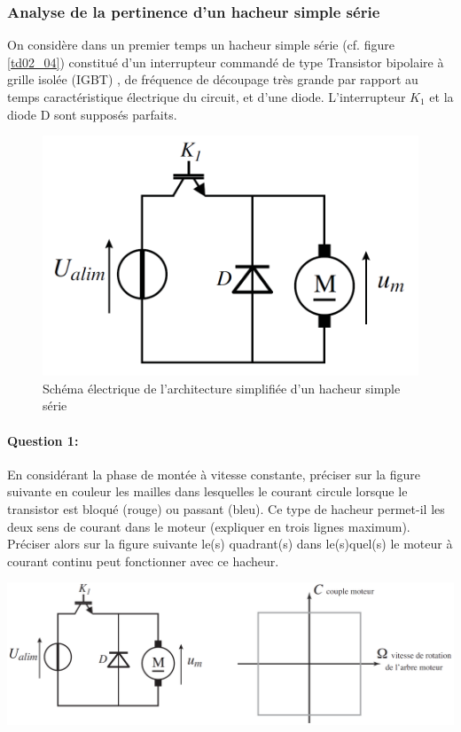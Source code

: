 \subsubsection{Analyse de la pertinence d'un hacheur simple série}

On considère dans un premier temps un hacheur simple série (cf. figure \ref{td02_04}) constitué d'un interrupteur
commandé de type \og Transistor bipolaire à grille isolée (IGBT) \fg, de fréquence de découpage très grande par
rapport au temps caractéristique électrique du circuit, et d'une diode. L'interrupteur $K_1$ et la diode D sont supposés parfaits.

\begin{figure}[!h]
 \centering \includegraphics[width=0.8\linewidth]{img/td02_07}
 \caption{Schéma électrique de l'architecture simplifiée d'un hacheur simple série}
 \label{td02_07}
\end{figure}

\paragraph{Question 1:}

En considérant la phase de montée à vitesse constante, préciser sur la figure suivante en couleur les mailles dans lesquelles le courant circule lorsque le transistor est bloqué (rouge) ou passant (bleu). Ce type de hacheur permet-il les deux sens de courant dans le moteur (expliquer en trois lignes maximum). Préciser alors sur la figure suivante le(s) quadrant(s) dans le(s)quel(s) le moteur à courant continu peut fonctionner avec ce hacheur.

\begin{center}
 \includegraphics[width=0.8\linewidth]{img/td02_10}
\end{center}

